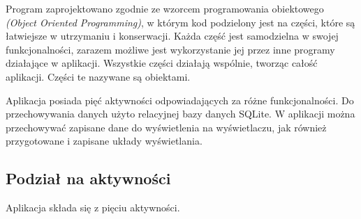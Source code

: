 \documentclass[a4paper,12pt, twoside]{article}
\begin{document}
    	Program zaprojektowano zgodnie ze wzorcem programowania obiektowego \textit{(Object Oriented Programming)}\cite{oop}, w którym kod podzielony jest na części, które są łatwiejsze w utrzymaniu i konserwacji. Każda część jest samodzielna w swojej funkcjonalności, zarazem możliwe jest wykorzystanie jej przez inne programy działające w aplikacji. Wszystkie części działają wspólnie, tworząc całość aplikacji. Części te nazywane są obiektami. 
    	
    	Aplikacja posiada pięć aktywności odpowiadających za różne funkcjonalności. Do przechowywania danych użyto relacyjnej bazy danych SQLite. W aplikacji można przechowywać zapisane dane do wyświetlenia na wyświetlaczu, jak również przygotowane i zapisane układy wyświetlania.
    	\subsection{Podział na aktywności}
    	\label{podzialnaaktywnosci}
    	Aplikacja składa się z pięciu aktywności.
\end{document}
